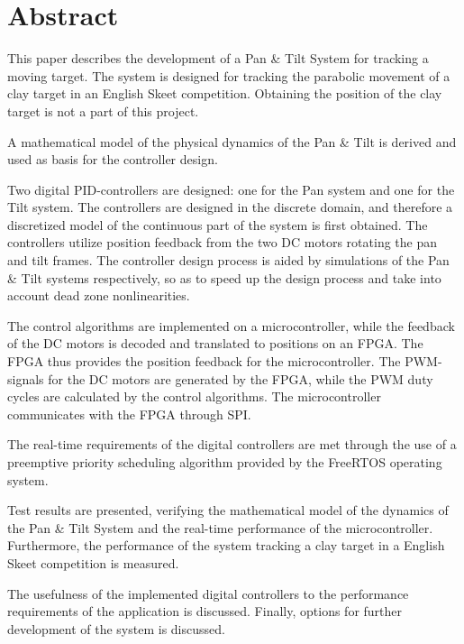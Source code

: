 
\setcounter{page}{1}
\section*{Abstract}
This paper describes the development of a Pan \& Tilt System for tracking a moving
target. The system is designed for tracking the parabolic movement of
a clay target in an English Skeet competition.
Obtaining the position of the clay target is not a part of this project. 

A mathematical model of the physical dynamics of the Pan \& Tilt is
derived and used as basis for the controller design.

Two digital PID-controllers are designed: one for the Pan system and one for the Tilt system.
The controllers are designed in the discrete domain, and therefore a discretized model
of the continuous part of the system is first obtained.
The controllers utilize position feedback from 
the two DC motors
rotating the pan and tilt frames.
The controller design process is aided by simulations of the Pan \& Tilt systems respectively,
so as to speed up the design process and take into account dead zone nonlinearities.

The control algorithms are implemented on a microcontroller, while
the feedback of the DC motors is decoded and translated to positions on an FPGA.
The FPGA thus provides the position feedback for the microcontroller.
The PWM-signals for the DC motors are generated by the FPGA, while the PWM duty cycles are calculated by the control algorithms.
The microcontroller communicates with the FPGA through SPI.

The real-time requirements of the digital controllers are met through the use
of a preemptive priority scheduling algorithm provided by the FreeRTOS operating
system.

Test results are presented,
verifying the mathematical model of the dynamics of the Pan \& Tilt System
and the real-time performance of the microcontroller.
Furthermore, the performance of the system tracking a clay target in a English Skeet competition is measured.

The usefulness of the implemented digital controllers to the performance requirements
of the application is discussed. Finally, options for further development of the system is discussed. 

